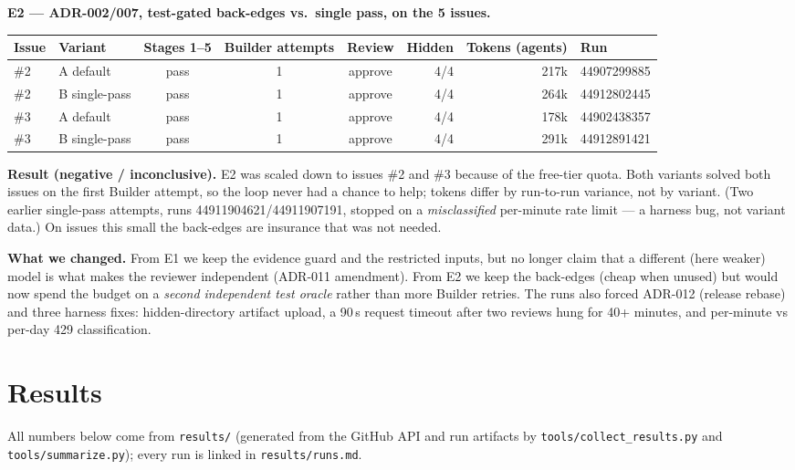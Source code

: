 \documentclass[10pt,a4paper]{article}
\newcommand{\code}[1]{\texttt{#1}}
\begin{document}
\textbf{E2 --- ADR-002/007, test-gated back-edges vs.\ single pass, on the 5 issues.}
\begin{table}[H]\centering\scriptsize
\begin{tabular}{@{}l l c c c r r l@{}}
\toprule
Issue & Variant & Stages 1--5 & Builder attempts & Review & Hidden & Tokens (agents) & Run\\
\midrule
\#2 & A default & pass & 1 & approve & 4/4 & 217k & 44907299885\\
\#2 & B single-pass & pass & 1 & approve & 4/4 & 264k & 44912802445\\
\#3 & A default & pass & 1 & approve & 4/4 & 178k & 44902438357\\
\#3 & B single-pass & pass & 1 & approve & 4/4 & 291k & 44912891421\\
\bottomrule
\end{tabular}
\end{table}
\textbf{Result (negative / inconclusive).} E2 was scaled down to issues \#2 and \#3 because of the
free-tier quota. Both variants solved both issues on the first Builder attempt, so the loop never had a
chance to help; tokens differ by run-to-run variance, not by variant. (Two earlier single-pass attempts,
runs 44911904621/44911907191, stopped on a \emph{misclassified} per-minute rate limit --- a harness bug,
not variant data.) On issues this small the back-edges are insurance that was not needed.

\textbf{What we changed.} From E1 we keep the evidence guard and the restricted inputs, but no longer
claim that a different (here weaker) model is what makes the reviewer independent (ADR-011 amendment).
From E2 we keep the back-edges (cheap when unused) but would now spend the budget on a \emph{second
independent test oracle} rather than more Builder retries. The runs also forced ADR-012 (release
rebase) and three harness fixes: hidden-directory artifact upload, a 90\,s request timeout after two
reviews hung for 40+ minutes, and per-minute vs per-day 429 classification.

\section{Results}
All numbers below come from \code{results/} (generated from the GitHub API and run artifacts by
\code{tools/collect\_results.py} and \code{tools/summarize.py}); every run is linked in \code{results/runs.md}.
\end{document}
